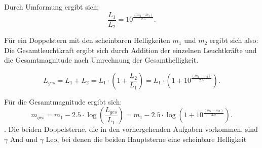 Durch Umformung ergibt sich: 
\begin{equation}
\frac{L_1}{L_2} = 10^{\frac{(m_2 - m_1)}{2.5}}. 
\end{equation}

Für ein Doppelstern mit den scheinbaren Helligkeiten $m_1$ und $m_2$ ergibt sich also: 
Die Gesamtleuchtkraft ergibt sich durch Addition der einzelnen Leuchtkräfte und die Gesamtmagnitude nach Umrechnung der Gesamthelligkeit. 

\begin{equation}
L_{ges} = L_1 + L_2 = L_1 \cdot (1 + \frac{L_2}{L_1}) = L_1 \cdot (1 + 10^{\frac{(m_1 - m_2)}{2.5}}). 
\end{equation}

Für die Gesamtmagnitude ergibt sich:
\begin{equation}
m_{ges} = m_1 - 2.5\cdot \log(\frac{L_{ges}}{L_1}) = m_1 - 2.5\cdot \log(1 + 10^{\frac{(m_1 - m_2)}{2.5}}).
\end{equation}. 
Die beiden Doppelsterne, die in den vorhergehenden Aufgaben vorkommen, sind $\gamma$ And und $\gamma$ Leo, bei denen die beiden Hauptsterne eine scheinbare Helligkeit 